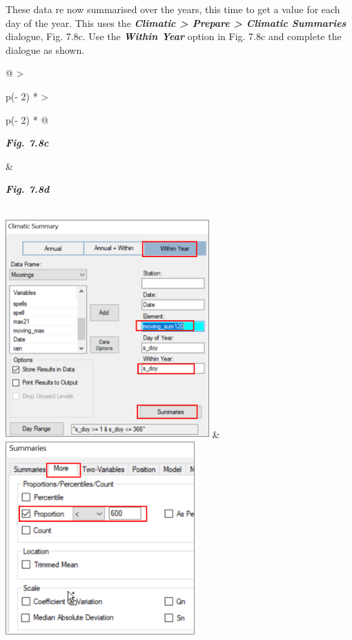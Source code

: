\documentclass[
  letterpaper,
  DIV=11,
  numbers=noendperiod]{scrreprt}
\begin{document}
These data re now summarised over the years, this time to get a value
for each day of the year. This uses the \textbf{\emph{Climatic
\textgreater{} Prepare \textgreater{} Climatic Summaries}} dialogue,
Fig. 7.8c. Use the \textbf{\emph{Within Year}} option in Fig. 7.8c and
complete the dialogue as shown.

\begin{longtable}[]{@{}
  >{\raggedright\arraybackslash}p{(\columnwidth - 2\tabcolsep) * }
  >{\raggedright\arraybackslash}p{(\columnwidth - 2\tabcolsep) * }@{}}
\toprule\noalign{}
\begin{minipage}[b]{\linewidth}\raggedright
\textbf{\emph{Fig. 7.8c}}
\end{minipage} & \begin{minipage}[b]{\linewidth}\raggedright
\textbf{\emph{Fig. 7.8d}}
\end{minipage} \\
\midrule\noalign{}
\endhead
\bottomrule\noalign{}
\endlastfoot
\includegraphics[width=3.07124in,height=3.28872in]{figures/Fig7.8c.png}
&
\includegraphics[width=2.85434in,height=2.92521in]{figures/Fig7.8d.png} \\
\end{longtable}
\end{document}
